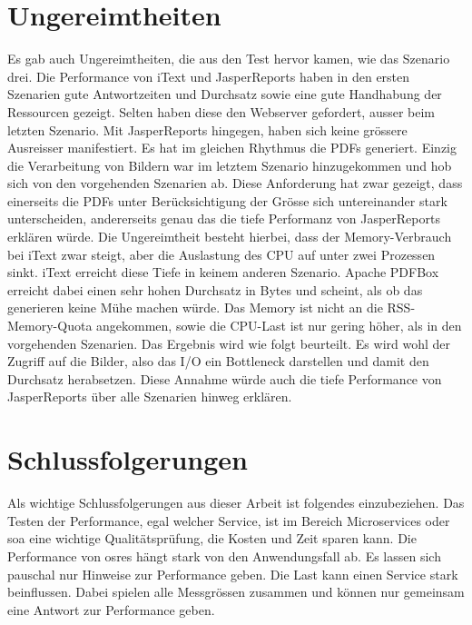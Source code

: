 \documentclass[main.tex]{subfiles}
\begin{document}
\section{Ungereimtheiten}
Es gab auch Ungereimtheiten, die aus den Test hervor kamen, wie das Szenario drei. Die Performance von iText und JasperReports haben in den ersten Szenarien gute Antwortzeiten und Durchsatz sowie eine gute Handhabung der Ressourcen gezeigt. Selten haben diese den Webserver gefordert, ausser beim letzten Szenario. Mit JasperReports hingegen, haben sich keine grössere Ausreisser manifestiert. Es hat im gleichen Rhythmus die PDFs generiert. Einzig die Verarbeitung von Bildern war im letztem Szenario hinzugekommen und hob sich von den vorgehenden Szenarien ab. Diese Anforderung hat zwar gezeigt, dass einerseits die PDFs unter Berücksichtigung der Grösse sich untereinander stark unterscheiden, andererseits genau das die tiefe Performanz von JasperReports erklären würde. Die Ungereimtheit besteht hierbei, dass der Memory-Verbrauch bei iText zwar steigt, aber die Auslastung des CPU auf unter zwei Prozessen sinkt. iText erreicht diese Tiefe in keinem anderen Szenario.  Apache PDFBox erreicht dabei einen sehr hohen Durchsatz in Bytes und scheint, als ob das generieren keine Mühe machen würde. Das Memory ist nicht an die RSS-Memory-Quota angekommen, sowie die CPU-Last ist nur gering höher, als in den vorgehenden Szenarien.  Das Ergebnis wird wie folgt beurteilt. Es wird wohl der Zugriff auf die Bilder, also das I/O ein Bottleneck darstellen und damit den Durchsatz herabsetzen. Diese Annahme würde auch die tiefe Performance von JasperReports über alle Szenarien hinweg erklären.
\section{Schlussfolgerungen}
Als wichtige Schlussfolgerungen aus dieser Arbeit ist folgendes einzubeziehen. Das Testen der Performance, egal welcher Service, ist im Bereich Microservices oder \acrshort{soa} eine wichtige Qualitätsprüfung, die Kosten und Zeit sparen kann. Die Performance von \acrshort{osre}s hängt stark von den Anwendungsfall ab. Es lassen sich pauschal nur Hinweise zur Performance geben. Die Last kann einen Service stark beinflussen. Dabei spielen alle Messgrössen zusammen und können nur gemeinsam eine Antwort zur Performance geben.  
\end{document}
